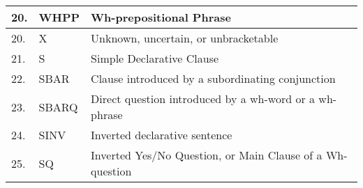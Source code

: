 \begin{table}[h]
\begin{tabular}{| l | l | l |}
20. & 	WHPP &	Wh-prepositional Phrase \\ \hline
20. & 	X & Unknown, uncertain, or unbracketable\\ \hline
 \hline
21. & 	S &  Simple Declarative Clause \\ \hline
22. & SBAR &   Clause introduced by a subordinating conjunction \\ \hline
23. & 	SBARQ &  Direct question introduced by a wh-word or a wh-phrase \\ \hline
24. & 	SINV &   Inverted declarative sentence \\ \hline
25. & SQ & Inverted Yes/No Question, or Main Clause of a Wh-question\\ \hline

    \end{tabular}

\end{table}




